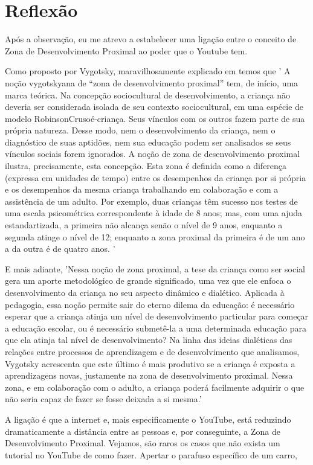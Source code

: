 \section{Reflexão}

Após a observação, eu me atrevo a estabelecer uma ligação entre o conceito de Zona de Desenvolvimento Proximal ao poder que o Youtube tem.

Como proposto por Vygotsky, maravilhosamente explicado em  temos que '
A noção vygotskyana de “zona de desenvolvimento proximal” tem, de início, uma marca teórica. Na concepção sociocultural de desenvolvimento, a criança não deveria ser considerada isolada de seu contexto sociocultural, em uma espécie de modelo RobinsonCrusoé-criança. Seus vínculos com os outros fazem parte de sua própria natureza. Desse modo, nem o desenvolvimento da criança, nem o diagnóstico de suas aptidões, nem sua educação podem ser analisados se seus vínculos sociais forem ignorados. A noção de zona de desenvolvimento proximal ilustra, precisamente, esta concepção. Esta zona é definida como a diferença (expressa em unidades de tempo) entre os desempenhos da criança por si própria e os desempenhos da mesma criança trabalhando em colaboração e com a assistência de um adulto. Por exemplo, duas crianças têm sucesso nos testes de uma escala psicométrica correspondente à idade de 8 anos; mas, com uma ajuda estandartizada, a primeira não alcança senão o nível de 9 anos, enquanto a segunda atinge o nível de 12; enquanto a zona proximal da primeira é de um ano a da outra é de quatro anos. '

E mais adiante, 'Nessa noção de zona proximal, a tese da criança como ser social gera um aporte metodológico de grande significado, uma vez que ele enfoca o desenvolvimento da criança no seu aspecto dinâmico e dialético. Aplicada à pedagogia, essa noção permite sair do eterno dilema da educação: é necessário esperar que a criança atinja um nível de desenvolvimento particular para começar a educação escolar, ou é necessário submetê-la a uma determinada educação para que ela atinja tal nível de desenvolvimento? Na linha das ideias dialéticas das relações entre processos de aprendizagem e de desenvolvimento que analisamos, Vygotsky acrescenta que este último é mais produtivo se a criança é exposta a aprendizagens novas, justamente na zona de desenvolvimento proximal. Nessa zona, e em colaboração com o adulto, a criança poderá facilmente adquirir o que não seria capaz de fazer se fosse deixada a si mesma.'

A ligação é que a internet e, mais especificamente o YouTube, está reduzindo dramaticamente a distância entre as pessoas e, por conseguinte, a Zona de Desenvolvimento Proximal. Vejamos, são raros os casos que não exista um tutorial no YouTube de como fazer. Apertar o parafuso específico de um carro,